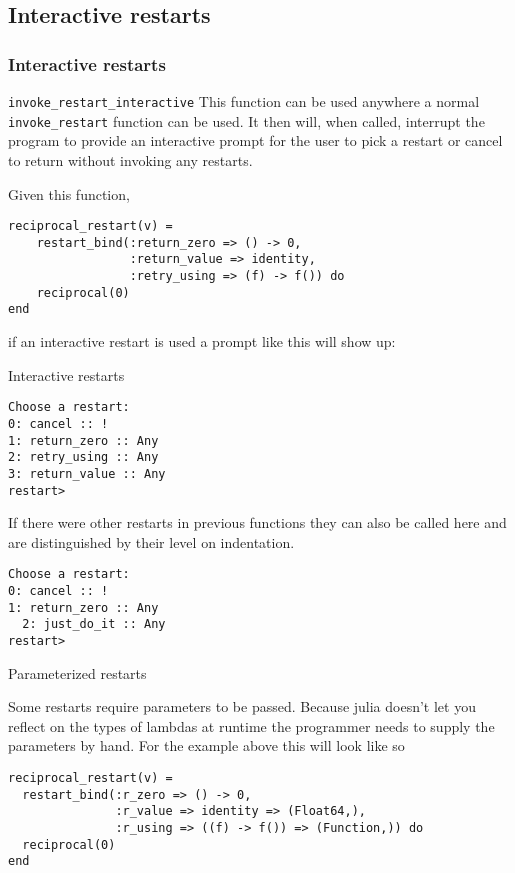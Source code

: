 \documentclass{beamer}
\begin{document}
\subsection{Interactive restarts}
\begin{frame}[fragile]
\frametitle{Interactive restarts}
\begin{block}{\texttt{invoke\_restart\_interactive}}
This function can be used anywhere a normal \texttt{invoke\_restart} function can be used. It then will, when called,
interrupt the program to provide an interactive prompt for the user to pick a restart or cancel to return
without invoking any restarts.
\end{block}
\begin{example}
Given this function,
\begin{verbatim}
reciprocal_restart(v) =
    restart_bind(:return_zero => () -> 0,
                 :return_value => identity,
                 :retry_using => (f) -> f()) do
    reciprocal(0)
end
\end{verbatim}
if an interactive restart is used a prompt like this will show up:
\end{example}
\end{frame}

\begin{frame}[fragile]{Interactive restarts}
\begin{example}
\begin{verbatim}
Choose a restart:
0: cancel :: !
1: return_zero :: Any
2: retry_using :: Any
3: return_value :: Any
restart>
\end{verbatim}
\end{example}
\begin{example}
If there were other restarts in previous functions they can also be called here
and are distinguished by their level on indentation.
\begin{verbatim}
Choose a restart:
0: cancel :: !
1: return_zero :: Any
  2: just_do_it :: Any
restart>
\end{verbatim}
\end{example}

\end{frame}

\begin{frame}[fragile]{Parameterized restarts}\label{f:param_restart}

\begin{block}{}
Some restarts require parameters to be passed. Because julia doesn't let you reflect on the types of
lambdas at runtime the programmer needs to supply the parameters by hand. For the example above this will look
like so
\end{block}
\begin{example}
\begin{verbatim}
reciprocal_restart(v) =
  restart_bind(:r_zero => () -> 0,
               :r_value => identity => (Float64,),
               :r_using => ((f) -> f()) => (Function,)) do
  reciprocal(0)
end
\end{verbatim}
\end{example}
\end{frame}
\end{document}
